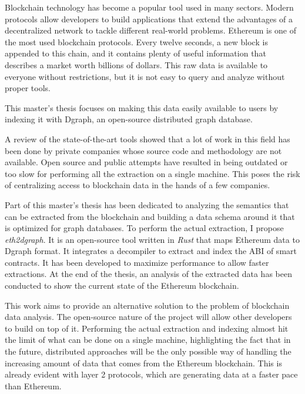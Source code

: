 Blockchain technology has become a popular tool used in many sectors. Modern protocols allow developers to build applications that extend the advantages of a decentralized network to tackle different real-world problems. Ethereum is one of the most used blockchain protocols. Every twelve seconds, a new block is appended to this chain, and it contains plenty of useful information that describes a market worth billions of dollars. This raw data is available to everyone without restrictions, but it is not easy to query and analyze without proper tools. 

This master's thesis focuses on making this data easily available to users by indexing it with Dgraph, an open-source distributed graph database. 

A review of the state-of-the-art tools showed that a lot of work in this field has been done by private companies whose source code and methodology are not available. Open source and public attempts have resulted in being outdated or too slow for performing all the extraction on a single machine. This poses the risk of centralizing access to blockchain data in the hands of a few companies.

Part of this master's thesis has been dedicated to analyzing the semantics that can be extracted from the blockchain and building a data schema around it that is optimized for graph databases. To perform the actual extraction, I propose \textit{eth2dgraph}. It is an open-source tool written in \textit{Rust} that maps Ethereum data to Dgraph format. It integrates a decompiler to extract and index the ABI of smart contracts. It has been developed to maximize performance to allow faster extractions. At the end of the thesis, an analysis of the extracted data has been conducted to show the current state of the Ethereum blockchain.

This work aims to provide an alternative solution to the problem of blockchain data analysis. The open-source nature of the project will allow other developers to build on top of it. Performing the actual extraction and indexing almost hit the limit of what can be done on a single machine, highlighting the fact that in the future, distributed approaches will be the only possible way of handling the increasing amount of data that comes from the Ethereum blockchain. This is already evident with layer 2 protocols, which are generating data at a faster pace than Ethereum.

